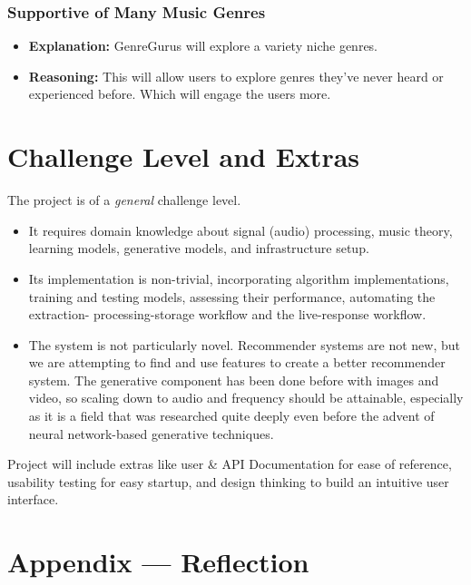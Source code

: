 \documentclass{article}
\begin{document}
\subsubsection*{Supportive of Many Music Genres}
\begin{itemize}
    \item \textbf{Explanation:} GenreGurus will explore a variety niche genres.
    \item \textbf{Reasoning:} This will allow users to explore genres they’ve never heard or experienced before. Which will engage the users more.
\end{itemize}

\section{Challenge Level and Extras}

The project is of a \emph{general} challenge level.
\begin{itemize}
    \item It requires domain knowledge about signal (audio) processing, music
    theory, learning models, generative models, and infrastructure setup.
    \item Its implementation is non-trivial, incorporating algorithm implementations, 
    training and testing models, assessing their performance, automating the extraction-
    processing-storage workflow and the live-response workflow.
    \item The system is not particularly novel. Recommender systems are not new, but we are 
    attempting to find and use features to create a better recommender system. The generative 
    component has been done before with images and video, so scaling down to audio and frequency 
    should be attainable, especially as it is a field that was researched quite deeply even before 
    the advent of neural network-based generative techniques.
\end{itemize}

\noindent
Project will include extras like user \& API Documentation for ease of reference, usability testing 
for easy startup, and design thinking to build an intuitive user interface.

\newpage{}

\section*{Appendix --- Reflection}
\end{document}
